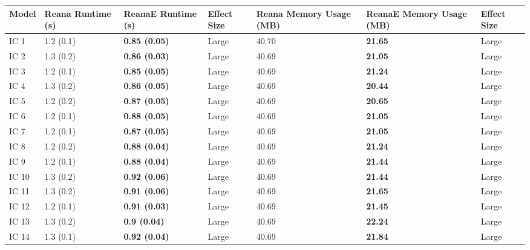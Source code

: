 \begin{tabular}{lllllll}
\toprule
 Model & Reana Runtime (s) &    ReanaE Runtime (s) & Effect Size & Reana Memory Usage (MB) & ReanaE Memory Usage (MB) & Effect Size \\
\midrule
  IC 1 &         1.2 (0.1) &  \textbf{0.85 (0.05)} &       Large &                   40.70 &           \textbf{21.65} &       Large \\
  IC 2 &         1.3 (0.2) &  \textbf{0.86 (0.03)} &       Large &                   40.69 &           \textbf{21.05} &       Large \\
  IC 3 &         1.2 (0.1) &  \textbf{0.85 (0.05)} &       Large &                   40.69 &           \textbf{21.24} &       Large \\
  IC 4 &         1.3 (0.2) &  \textbf{0.86 (0.05)} &       Large &                   40.69 &           \textbf{20.44} &       Large \\
  IC 5 &         1.2 (0.2) &  \textbf{0.87 (0.05)} &       Large &                   40.69 &           \textbf{20.65} &       Large \\
  IC 6 &         1.2 (0.1) &  \textbf{0.88 (0.05)} &       Large &                   40.69 &           \textbf{21.05} &       Large \\
  IC 7 &         1.2 (0.1) &  \textbf{0.87 (0.05)} &       Large &                   40.69 &           \textbf{21.05} &       Large \\
  IC 8 &         1.2 (0.2) &  \textbf{0.88 (0.04)} &       Large &                   40.69 &           \textbf{21.24} &       Large \\
  IC 9 &         1.2 (0.1) &  \textbf{0.88 (0.04)} &       Large &                   40.69 &           \textbf{21.44} &       Large \\
 IC 10 &         1.3 (0.2) &  \textbf{0.92 (0.06)} &       Large &                   40.69 &           \textbf{21.44} &       Large \\
 IC 11 &         1.3 (0.2) &  \textbf{0.91 (0.06)} &       Large &                   40.69 &           \textbf{21.65} &       Large \\
 IC 12 &         1.2 (0.1) &  \textbf{0.91 (0.03)} &       Large &                   40.69 &           \textbf{21.45} &       Large \\
 IC 13 &         1.3 (0.2) &   \textbf{0.9 (0.04)} &       Large &                   40.69 &           \textbf{22.24} &       Large \\
 IC 14 &         1.3 (0.1) &  \textbf{0.92 (0.04)} &       Large &                   40.69 &           \textbf{21.84} &       Large \\

\end{tabular}
